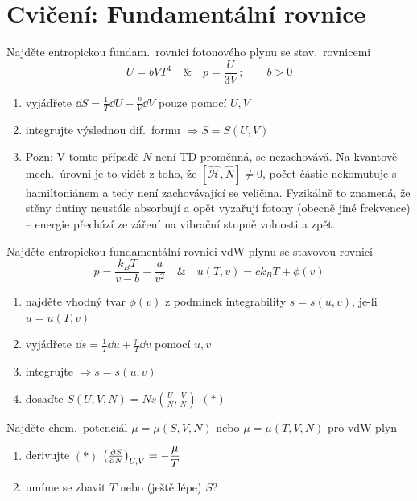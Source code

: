\section{Cvičení: Fundamentální rovnice}

\begin{priklad}
Najděte entropickou fundam.\ rovnici fotonového plynu se stav.\ rovnicemi
\[ U = bVT^4 \quad \& \quad p = \frac{U}{3V}\,; \qquad b > 0 \]
\end{priklad}
\begin{enumerate}[label=\arabic*),font=\color{NavyBlue}]\color{NavyBlue}
  \item vyjádřete $\dd S = \frac1T\dd U - \frac{p}{V}\dd V$ pouze pomocí $U, V$
  \item integrujte výslednou dif.\ formu $\Rightarrow S = S(U,V)$
  \item \underline{Pozn:} V tomto případě $N$ není TD proměnná,  se nezachovává. Na kvantově-mech.\ úrovni je to vidět z toho, že $[\hat{\mathcal{H}}, \hat N] \neq 0$, počet částic nekomutuje s hamiltoniánem a tedy není zachovávající se veličina. Fyzikálně to znamená, že stěny dutiny neustále absorbují a opět vyzařují fotony (obecně jiné frekvence) -- energie přechází ze záření na vibrační stupně volnosti a zpět.
\end{enumerate}

\begin{priklad}[Příklad 2]
Najděte entropickou fundamentální rovnici vdW plynu se stavovou rovnicí
\[ p = \frac{k_BT}{v - b} - \frac{a}{v^2} \quad \& \quad u(T,v) = ck_BT + \phi(v) \]
\end{priklad}
\begin{enumerate}[label=\arabic*),font=\color{NavyBlue}]\color{NavyBlue}
  \item najděte vhodný tvar $\phi(v)$ z podmínek integrability $s = s(u,v)$, je-li $u = u(T,v)$
  \item vyjádřete $\dd s = \frac1T\dd u + \frac{p}{T}\dd v$ pomocí $u, v$
  \item integrujte $\Rightarrow s = s(u,v)$
  \item dosaďte \quad $S(U,V,N) = Ns\left(\frac{U}{N}, \frac{V}{N}\right)$ \hfill $(*)$
\end{enumerate}

\begin{priklad}
Najděte chem.\ potenciál $\mu = \mu(S,V,N)$ nebo $\mu = \mu(T,V,N)$ pro vdW plyn
\end{priklad}
\begin{enumerate}[label=\arabic*),font=\color{NavyBlue}]\color{NavyBlue}
  \item derivujte $(*)$ \quad $\left(\pdv{S}{N}\right)_{U,V} = -\dfrac{\mu}{T}$
  \item umíme se zbavit $T$ nebo (ještě lépe) $S$?
\end{enumerate}

